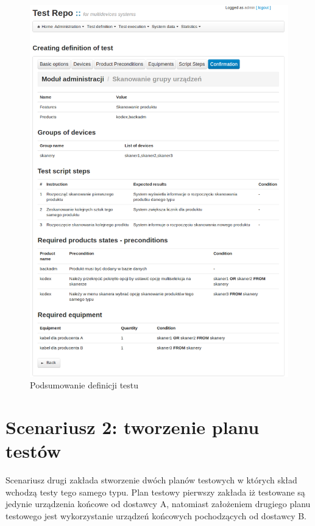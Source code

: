   \begin{figure}[h]
  \begin{center}
    \includegraphics[scale=0.4]{img/screen/tworzenieTestuPodsumowanie.png}
    \caption{Podsumowanie definicji testu}
    \label{fig:podsumowanieTestu}
  \end{center}
\end{figure}

\section{Scenariusz 2: tworzenie planu testów}

Scenariusz drugi zakłada stworzenie dwóch planów testowych w których skład wchodzą testy tego samego typu. Plan testowy pierwszy zakłada iż testowane są jedynie urządzenia końcowe od dostawcy A, natomiast założeniem drugiego planu testowego jest wykorzystanie urządzeń końcowych pochodzących od dostawcy B.

